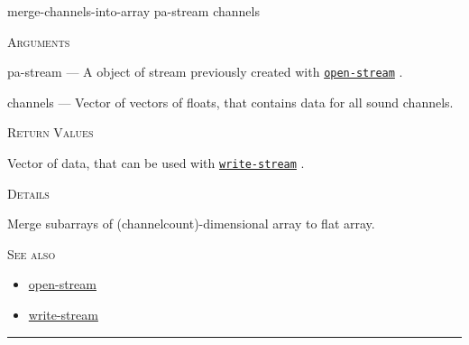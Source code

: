 \documentclass[a4paper]{report}
\begin{document}
    \label{portaudio__fun__merge-channels-into-array}
    \begin{defun}[Function]
    merge-channels-into-array pa-stream channels


    
    \bigskip
    \textsc{Arguments}

pa-stream
	--- A object of stream previously created with \hyperref[portaudio__fun__open-stream]{\texttt{open-stream}}
  .

channels
	--- Vector of vectors of floats, that contains data for all sound channels.




    
    \bigskip
    \textsc{Return Values}

Vector of data, that can be used with \hyperref[portaudio__fun__write-stream]{\texttt{write-stream}}
  .


	
    \bigskip
    \textsc{Details}

Merge subarrays of (channelcount)-dimensional array to flat array.






      
    \bigskip
    \textsc{See also}


	
    \begin{itemize}
    
	  
    \item
    \hyperref[portaudio__fun__open-stream]{open-stream}
    
    \item
    \hyperref[portaudio__fun__write-stream]{write-stream}
    
	
    \end{itemize}
  
      


    
    \end{defun}
  
  

    \rule{\linewidth}{0.1mm}
    
\end{document}
